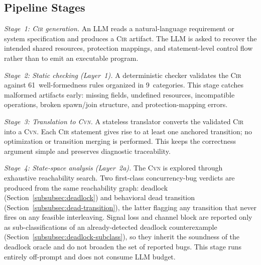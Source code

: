 \subsection{Pipeline Stages}
\label{subsec:pipeline-overview}
\emph{Stage~1: \textsc{Cir} generation.}
An LLM reads a natural-language requirement or system specification and produces a \textsc{Cir} artifact. The LLM is asked to recover the intended shared resources, protection mappings, and statement-level control flow rather than to emit an executable program.

\emph{Stage~2: Static checking (Layer~1).}
A deterministic checker validates the \textsc{Cir} against 61~well-formedness rules organized in 9~categories. This stage catches malformed artifacts early: missing fields, undefined resources, incompatible operations, broken spawn/join structure, and protection-mapping errors.

\emph{Stage~3: Translation to \textsc{Cvn}.}
A stateless translator converts the validated \textsc{Cir} into a \textsc{Cvn}. Each \textsc{Cir} statement gives rise to at least one anchored transition; no optimization or transition merging is performed. This keeps the correctness argument simple and preserves diagnostic traceability.

\emph{Stage~4: State-space analysis (Layer~2a).}
The \textsc{Cvn} is explored through exhaustive reachability search.
Two first-class concurrency-bug verdicts are produced from the same
reachability graph: deadlock (Section~\ref{subsubsec:deadlock}) and
behavioral dead transition
(Section~\ref{subsubsec:dead-transition}), the latter flagging any
transition that never fires on any feasible interleaving. Signal loss
and channel block are reported only as sub-classifications of an
already-detected deadlock counterexample
(Section~\ref{subsubsec:deadlock-subclass}), so they inherit the
soundness of the deadlock oracle and do not broaden the set of
reported bugs. This stage runs entirely off-prompt and does not
consume LLM budget.

